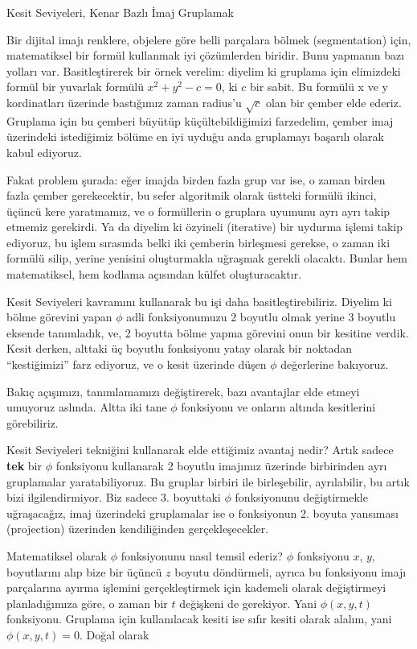 \documentclass[12pt,fleqn]{article}\usepackage{../../common}
\begin{document}
Kesit Seviyeleri, Kenar Bazlı İmaj Gruplamak

Bir dijital imajı renklere, objelere göre belli parçalara bölmek
(segmentation) için, matematiksel bir formül kullanmak iyi çözümlerden
biridir. Bunu yapmanın bazı yolları var. Basitleştirerek bir örnek
verelim: diyelim ki gruplama için elimizdeki formül bir yuvarlak
formülü $x^2+y^2 - c = 0$, ki $c$ bir sabit. Bu formülü x ve y
kordinatları üzerinde bastığımız zaman radius'u $\sqrt{c}$ olan bir
çember elde ederiz. Gruplama için bu çemberi büyütüp
küçültebildiğimizi farzedelim, çember imaj üzerindeki istediğimiz
bölüme en iyi uyduğu anda gruplamayı başarılı olarak kabul ediyoruz.

Fakat problem şurada: eğer imajda birden fazla grup var ise, o zaman
birden fazla çember gerekecektir, bu sefer algoritmik olarak üstteki
formülü ikinci, üçüncü kere yaratmamız, ve o formüllerin o gruplara
uyumunu ayrı ayrı takip etmemiz gerekirdi. Ya da diyelim ki özyineli
(iterative) bir uydurma işlemi takip ediyoruz, bu işlem sırasında
belki iki çemberin birleşmesi gerekse, o zaman iki formülü silip,
yerine yenisini oluşturmakla uğraşmak gerekli olacaktı. Bunlar hem
matematiksel, hem kodlama açısından külfet oluşturacaktır.

Kesit Seviyeleri kavramını kullanarak bu işi daha
basitleştirebiliriz. Diyelim ki bölme görevini yapan $\phi$ adli
fonksiyonumuzu 2 boyutlu olmak yerine 3 boyutlu eksende tanımladık,
ve, 2 boyutta bölme yapma görevini onun bir kesitine verdik. Kesit
derken, alttaki üç boyutlu fonksiyonu yatay olarak bir noktadan
``kestiğimizi'' farz ediyoruz, ve o kesit üzerinde düşen $\phi$
değerlerine bakıyoruz.

Bakıç açışımızı, tanımlamamızı değiştirerek, bazı avantajlar elde
etmeyi umuyoruz aslında. Altta iki tane $\phi$ fonksiyonu ve onların
altında kesitlerini görebiliriz.


Kesit Seviyeleri tekniğini kullanarak elde ettiğimiz avantaj nedir?
Artık sadece \textbf{tek} bir $\phi$ fonksiyonu kullanarak 2 boyutlu
imajımız üzerinde birbirinden ayrı gruplamalar yaratabiliyoruz. Bu
gruplar birbiri ile birleşebilir, ayrılabilir, bu artık bizi
ilgilendirmiyor. Biz sadece 3. boyuttaki $\phi$ fonksiyonunu
değiştirmekle uğraşacağız, imaj üzerindeki gruplamalar ise o
fonksiyonun 2. boyuta yansıması (projection) üzerinden kendiliğinden
gerçekleşecekler.

Matematiksel olarak $\phi$ fonksiyonunu nasıl temsil ederiz? $\phi$
fonksiyonu $x$, $y$, boyutlarını alıp bize bir üçüncü $z$ boyutu
döndürmeli, ayrıca bu fonksiyonu imajı parçalarına ayırma işlemini
gerçekleştirmek için kademeli olarak değiştirmeyi planladığımıza göre,
o zaman bir $t$ değişkeni de gerekiyor. Yani $\phi(x,y,t)$
fonksiyonu. Gruplama için kullanılacak kesiti ise sıfır kesiti olarak
alalım, yani $\phi(x,y,t) = 0$. Doğal olarak
\end{document}
